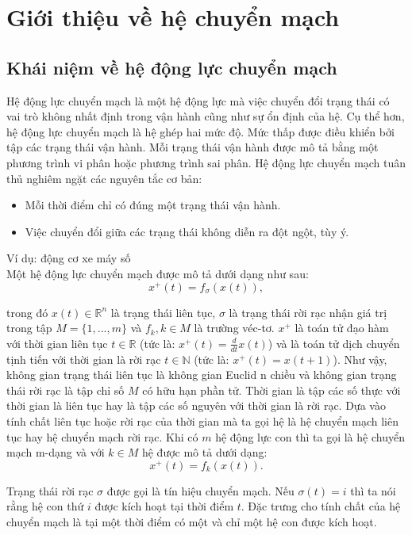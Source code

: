 \documentclass[14pt,a4paper,oneside]{report}		%
\begin{document}
\chapter{Giới thiệu về hệ chuyển mạch}
\section{Khái niệm về hệ động lực chuyển mạch}
Hệ động lực chuyển mạch là một hệ động lực mà việc chuyển đổi trạng thái có vai trò không nhất định trong vận hành cũng như sự ổn định của hệ. Cụ thể hơn, hệ động lực chuyển mạch là hệ ghép hai mức độ. Mức thấp được điều khiển bởi tập các trạng thái vận hành. Mỗi trạng thái vận hành được mô tả bằng một phương trình vi phân hoặc phương trình sai phân. Hệ động lực chuyển mạch tuân thủ nghiêm ngặt các nguyên tắc cơ bản:
\begin{itemize}
  \item Mỗi thời điểm chỉ có đúng một trạng thái vận hành.
  \item Việc chuyển đổi giữa các trạng thái không diễn ra đột ngột, tùy ý.
\end{itemize}
Ví dụ: động cơ xe máy số
\\

Một hệ động lực chuyển mạch được mô tả dưới dạng như sau:
\begin{equation} \label{eq1-1}
x^+(t) = f_\sigma(x(t)),
\end{equation}

trong đó $x(t)\in\mathbb{R}^n$ là trạng thái liên tục, $\sigma$ là trạng thái rời rạc nhận giá trị trong tập $M = \{1,...,m\}$ và $f_k, k\in M$ là trường véc-tơ. $x^+$ là toán tử đạo hàm với thời gian liên tục $t\in\mathbb{R}$ (tức là: $x^+(t)=\frac{d}{dt}x(t)$) và là toán tử dịch chuyển tịnh tiến với thời gian là rời rạc $t\in\mathbb{N}$ (tức là: $x^+(t)=x(t+1)$). Như vậy, không gian trạng thái liên tục là không gian Euclid n chiều và không gian trạng thái rời rạc là tập chỉ số $M$ có hữu hạn phần tử. Thời gian là tập các số thực với thời gian là liên tục hay là tập các số nguyên với thời gian là rời rạc. Dựa vào tính chất liên tục hoặc rời rạc của thời gian mà ta gọi hệ là hệ chuyển mạch liên tục hay hệ chuyển mạch rời rạc. Khi có $m$ hệ động lực con thì ta gọi là hệ chuyển mạch m-dạng và với $k\in M$ hệ được mô tả dưới dạng:
\begin{equation} \label{eq1-2}
x^+(t) = f_k(x(t)).
\end{equation}

Trạng thái rời rạc $\sigma$ được gọi là tín hiệu chuyển mạch. Nếu $\sigma(t)=i$ thì ta nói rằng hệ con thứ $i$ được kích hoạt tại thời điểm $t$. Đặc trưng cho tính chất của hệ chuyển mạch là tại một thời điểm có một và chỉ một hệ con được kích hoạt.\\
\end{document}
